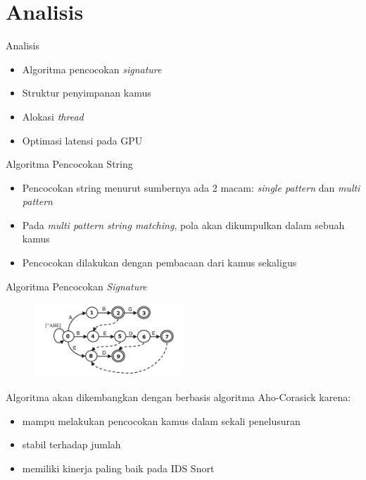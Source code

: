 \documentclass[10pt]{beamer}
\begin{document}
\section{Analisis}

\begin{frame}{Analisis}
    \begin{itemize}

        \item Algoritma pencocokan \emph{signature}

        \item Struktur penyimpanan kamus

        \item Alokasi \emph{thread}

        \item Optimasi latensi pada GPU

    \end{itemize}
\end{frame}

\begin{frame}[fragile]{Algoritma Pencocokan String}
    \begin{itemize}

        \item Pencocokan string menurut sumbernya ada 2 macam: \emph{single pattern} dan \emph{multi pattern}

        \item Pada \emph{multi pattern string matching}, pola akan dikumpulkan dalam sebuah kamus
    
        \item Pencocokan dilakukan dengan pembacaan dari kamus sekaligus

    \end{itemize}
\end{frame}

\begin{frame}{Algoritma Pencocokan \emph{Signature}}
    \begin{figure}
        \centering
        \includegraphics[width=0.5\textwidth]{../src/resources/aho-c.png}
    \end{figure}

    Algoritma akan dikembangkan dengan berbasis algoritma Aho-Corasick karena:
    \begin{itemize}
        \item mampu melakukan pencocokan kamus dalam sekali penelusuran
        \item stabil terhadap jumlah 
        \item memiliki kinerja paling baik pada IDS Snort
    \end{itemize}
\end{frame}
\end{document}
